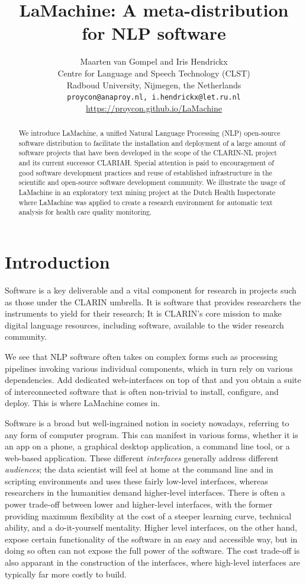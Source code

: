 \documentclass[a4paper,11pt]{article}
\title{LaMachine: A meta-distribution for NLP software}
\author{Maarten van Gompel  and Iris Hendrickx\\
  Centre for Language and Speech Technology (CLST) \\
  Radboud University, Nijmegen, the Netherlands \\
  {\tt proycon@anaproy.nl, i.hendrickx@let.ru.nl} \\ %
  \url{https://proycon.github.io/LaMachine}
}
\date{}
\begin{document}
\maketitle

\begin{abstract}
We introduce LaMachine, a unified Natural Language Processing (NLP) open-source software distribution to facilitate the
installation and deployment of a large amount of software projects that have been developed in the scope of the
CLARIN-NL project and its current successor CLARIAH. Special attention is paid to encouragement of good software
development practices and reuse of established infrastructure in the scientific and open-source software development
community. We illustrate the usage of LaMachine in an exploratory text mining project at the Dutch Health Inspectorate where LaMachine was applied to create a research environment for automatic text analysis for health care quality monitoring.
\end{abstract}

\section{Introduction}
\label{sec:intro}

Software is a key deliverable and a vital component for research in projects such as those under the CLARIN umbrella. It
is software that provides researchers the instruments to yield for their research; It is CLARIN's core mission to make
digital language resources, including software, available to the wider research community.

We see that NLP software often takes on complex forms such as processing pipelines invoking various individual
components, which in turn rely on various dependencies. Add dedicated web-interfaces on top of that and you obtain a
suite of interconnected software that is often non-trivial to install, configure, and deploy. This is where LaMachine
comes in.

Software is a broad but well-ingrained notion in society nowadays, referring to any form of computer program. This can
manifest in various forms, whether it is an app on a phone, a graphical desktop application, a command line tool, or a
web-based application. These different \emph{interfaces} generally address different \emph{audiences}; the data
scientist will feel at home at the command line and in scripting environments and uses these fairly low-level
interfaces, whereas researchers in the humanities demand higher-level interfaces. There is often a power trade-off
between lower and higher-level interfaces, with the former providing maximum flexibility at the cost of a steeper
learning curve, technical ability, and a do-it-yourself mentality. Higher level interfaces, on the other
hand, expose certain functionality of the software in an easy and accessible way, but in doing so often can not expose
the full power of the software. The cost trade-off is also apparant in the construction of the interfaces, where
high-level interfaces are typically far more costly to build.
\end{document}
